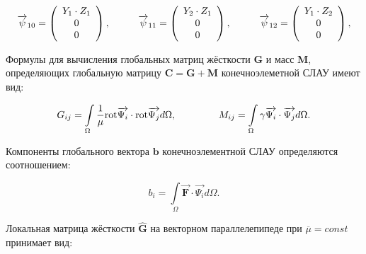 \begin{equation*}
	\overrightarrow{\psi}_{10} = \left(
	\begin{array}{c}
		Y_1 \cdot Z_1\\
		0\\
		0\\
	\end{array}
	\right),
	\hspace{10mm}
	\overrightarrow{\psi}_{11} = \left(
	\begin{array}{c}
		Y_2 \cdot Z_1\\
		0\\
		0\\
	\end{array}
	\right),
	\hspace{10mm}
	\overrightarrow{\psi}_{12} = \left(
	\begin{array}{c}
		Y_1 \cdot Z_2\\
		0\\
		0\\
	\end{array}
	\right),
\end{equation*}

Формулы для вычисления глобальных матриц жёсткости $\textbf{G}$ и масс $\textbf{M}$, определяющих глобальную матрицу $\textbf{C} = \textbf{G} + \textbf{M}$ конечноэлеметной СЛАУ имеют вид:

\begin{equation} \label{eq_1_15}
	G_{ij} = \int \limits_{\Omega} \frac{1}{\mu} \text{rot} \overrightarrow{\textbf{$\Psi_i$}} \cdot \text{rot} \overrightarrow{\textbf{$\Psi_j$}} d \Omega, \hspace{15mm} M_{ij} = \int \limits_{\Omega} \gamma \overrightarrow{\textbf{$\Psi_i$}} \cdot \overrightarrow{\textbf{$\Psi_j$}} d \Omega.
\end{equation}

Компоненты глобального вектора $\textbf{b}$ конечноэлементной СЛАУ определяются соотношением:

\begin{equation} \label{eq_1_15}
	b_{i} = \int \limits_{\Omega} \overrightarrow{\textbf{F}} \cdot \overrightarrow{\textbf{$\Psi_i$}} d \Omega.
\end{equation}

Локальная матрица жёсткости $\hat{\textbf{G}}$ на векторном параллелепипеде при $\overline{\mu} = const$ принимает вид:


